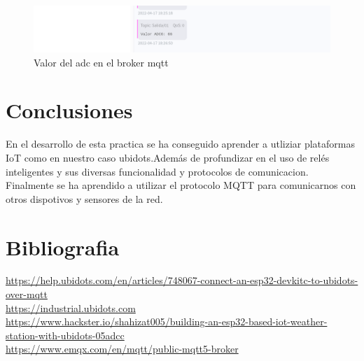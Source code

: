 \documentclass[11pt, letterpaper]{article}
\begin{document}
\begin{figure}[h]
    \centering
    \includegraphics[width=\textwidth]{Resultado_broker.png}
    \caption{Valor del adc en el broker mqtt}
    \label{fig:resultado_web}
\end{figure}


\section{Conclusiones}
En el desarrollo de esta practica se ha conseguido aprender a utliziar plataformas IoT como en nuestro caso
ubidots.Además de profundizar en el uso de relés inteligentes y sus diversas funcionalidad y protocolos de comunicacion. Finalmente se ha aprendido
a utilizar el protocolo MQTT para comunicarnos con otros dispotivos y sensores de la red.


\pagebreak
\section{Bibliografia}

\url{https://help.ubidots.com/en/articles/748067-connect-an-esp32-devkitc-to-ubidots-over-mqtt}\\
\url{https://industrial.ubidots.com}\\
\url{https://www.hackster.io/shahizat005/building-an-esp32-based-iot-weather-station-with-ubidots-05adcc}\\
\url{https://www.emqx.com/en/mqtt/public-mqtt5-broker}\\
\end{document}

